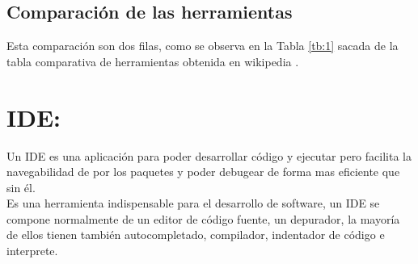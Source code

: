 \subsection{Comparación de las herramientas}
Esta comparación son dos filas, como se observa en la Tabla \ref{tb:1} sacada de la tabla comparativa de herramientas obtenida en wikipedia \cite{Template:table}.


\begin{table}[]
\centering
\caption{Tabla comparativa de herramientas}
\label{tb:1}
\end{table}
\section{IDE:}
Un IDE es una aplicación para poder desarrollar código y ejecutar pero facilita la navegabilidad de por los paquetes y poder debugear de forma mas eficiente que sin él.\\
Es una herramienta indispensable para el desarrollo de software, un IDE se compone normalmente de un editor de código fuente, un depurador, la mayoría de ellos tienen también autocompletado, compilador, indentador de código e interprete.

